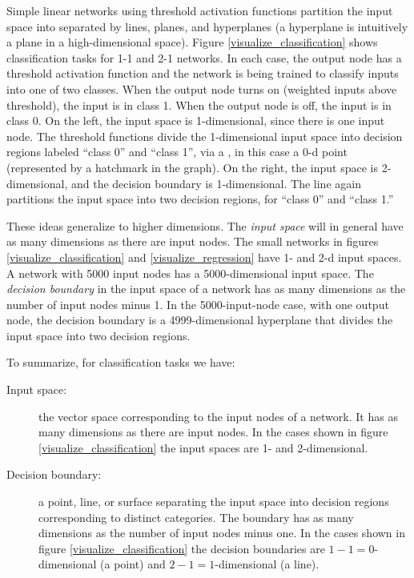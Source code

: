 Simple linear networks using threshold activation functions partition the input space into  separated by lines, planes, and hyperplanes (a hyperplane is intuitively a plane in a high-dimensional space). Figure \ref{visualize_classification} shows classification tasks for 1-1 and 2-1 networks. In each case, the output node has a threshold activation function and the network is being trained to classify inputs into one of two classes. When the output node turns on (weighted inputs above threshold), the input is in class 1. When the output node is off, the input is in class 0. On the left, the input space is 1-dimensional, since there is one input node. The threshold functions divide the 1-dimensional input space into decision regions  labeled ``class 0'' and ``class 1'', via a , in this case a 0-d point (represented by a hatchmark in the graph). On the right, the input space is 2-dimensional, and the decision boundary is 1-dimensional. The line again partitions the input space into two decision regions, for ``class 0'' and ``class 1.''

These ideas generalize to higher dimensions. The \emph{input space} will in general have as many dimensions as there are input nodes. The small networks in figures \ref{visualize_classification} and \ref{visualize_regression}  have 1- and 2-d input spaces. A network with 5000 input nodes has a 5000-dimensional input space. The \emph{decision boundary} in the input space of a network has as many dimensions as the number of input nodes minus 1. In the 5000-input-node case, with one output node, the decision boundary is a 4999-dimensional hyperplane that divides the input space into two decision regions.

To summarize, for classification tasks we have:
\begin{description}
\item[Input space:] the vector space corresponding to the input nodes of a network. It has as many dimensions as there are input nodes. In the cases shown in figure \ref{visualize_classification} the input spaces are 1- and 2-dimensional.
\item[Decision boundary:] a point, line, or surface separating the input space into decision regions corresponding to distinct categories. The boundary has as many dimensions as the number of input nodes minus one. In the cases shown in figure \ref{visualize_classification} the decision boundaries are $1-1=0$-dimensional (a point) and $2-1=1$-dimensional (a line).
\end{description}

